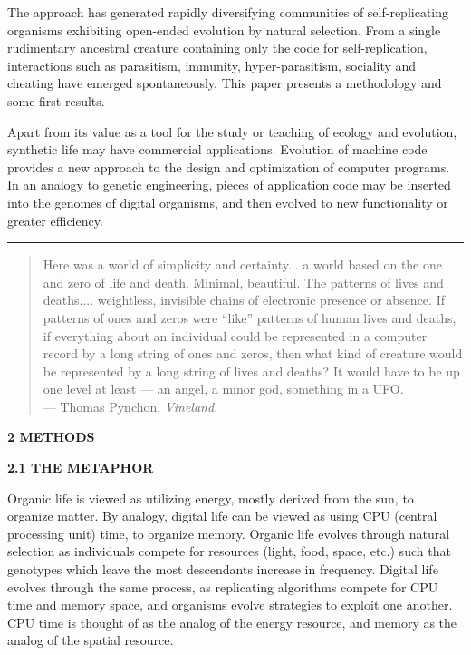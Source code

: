 The approach has generated rapidly diversifying communities of self-replicating
organisms exhibiting open-ended evolution by natural selection.  From a single
rudimentary ancestral creature containing only the code for self-replication,
interactions such as parasitism, immunity, hyper-parasitism, sociality and
cheating have emerged spontaneously.  This paper presents a methodology and
some first results.

Apart from its value as a tool for the study or teaching of ecology and
evolution, synthetic life may have commercial applications.  Evolution of
machine code provides a new approach to the design and optimization of
computer programs.  In an analogy to genetic engineering, pieces of
application code may be inserted into the genomes of digital organisms,
and then evolved to new functionality or greater efficiency.

\LP
\rule[6pt]{6.5in}{1pt}

\begin{quote}
Here was a world of simplicity and certainty...
a world based on the one and zero of life and
death.  Minimal, beautiful.  The patterns of lives and deaths....
weightless, invisible chains of electronic presence or absence.  If
patterns of ones and zeros were ``like'' patterns of human lives and
deaths, if everything about an individual could be represented in a
computer record by a long string of ones and zeros, then what kind of
creature would be represented by a long string of lives and deaths?
It would have to be up one level at least --- an angel, a minor god,
something in a UFO.\\
\hspace*{2in} --- Thomas Pynchon, \it Vineland\rm .
\end{quote}

\large \bf 2 METHODS\rm \normalsize

\bf 2.1 THE METAPHOR\rm
\eLP

Organic life is viewed as utilizing energy, mostly derived
from the sun, to organize matter.  By analogy, digital life can be
viewed as using CPU (central processing unit) time, to organize memory.
Organic life evolves through natural selection as individuals compete for
resources (light, food, space, etc.) such that genotypes which leave the
most descendants increase in frequency.  Digital life evolves through the
same process, as replicating algorithms compete for CPU time and memory
space, and organisms evolve strategies to exploit one another.  CPU time is
thought of as the analog of the energy resource, and memory as the analog
of the spatial resource.

